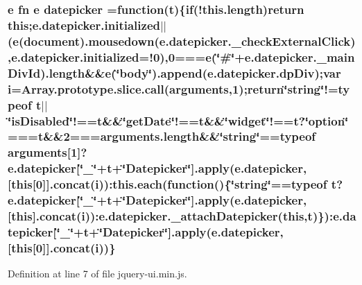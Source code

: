 {{\subsubsection[{\texorpdfstring{datepicker}{datepicker}}]{ {\bf e} {\bf fn} {\bf e} datepicker =function({\bf t})\{{\bf if}(!this.\+length)return {\bf this};{\bf e.\+datepicker.\+initialized}$\vert$$\vert$({\bf e}(document).mousedown(e.\+datepicker.\+\_\+check\+External\+Click),{\bf e.\+datepicker.\+initialized}=!0),0==={\bf e}(\char`\"{}\#\char`\"{}+e.\+datepicker.\+\_\+main\+Div\+Id).length\&\&{\bf e}(\char`\"{}body\char`\"{}).append(e.\+datepicker.\+dp\+Div);var {\bf i}={\bf Array.\+prototype.\+slice.\+call}(arguments,1);return\char`\"{}string\char`\"{}!=typeof {\bf t}$\vert$$\vert$\char`\"{}is\+Disabled\char`\"{}!==t\&\&\char`\"{}get\+Date\char`\"{}!==t\&\&\char`\"{}widget\char`\"{}!==t?\char`\"{}option\char`\"{}===t\&\&2===arguments.\+length\&\&\char`\"{}string\char`\"{}==typeof arguments\mbox{[}1\mbox{]}?e.\+datepicker\mbox{[}\char`\"{}\+\_\+\char`\"{}+t+\char`\"{}Datepicker\char`\"{}\mbox{]}.apply(e.\+datepicker,\mbox{[}{\bf this}\mbox{[}0\mbox{]}\mbox{]}.concat({\bf i}))\+:{\bf this.\+each}(function()\{\char`\"{}string\char`\"{}==typeof {\bf t}?e.\+datepicker\mbox{[}\char`\"{}\+\_\+\char`\"{}+t+\char`\"{}Datepicker\char`\"{}\mbox{]}.apply(e.\+datepicker,\mbox{[}{\bf this}\mbox{]}.concat({\bf i}))\+:e.\+datepicker.\+\_\+attach\+Datepicker({\bf this},{\bf t})\})\+:e.\+datepicker\mbox{[}\char`\"{}\+\_\+\char`\"{}+t+\char`\"{}Datepicker\char`\"{}\mbox{]}.apply(e.\+datepicker,\mbox{[}{\bf this}\mbox{[}0\mbox{]}\mbox{]}.concat({\bf i}))\}}\hypertarget{jquery-ui_8min_8js_a7c9a8108056447655bbd92e41f0c9f6f}{}\label{jquery-ui_8min_8js_a7c9a8108056447655bbd92e41f0c9f6f}


Definition at line 7 of file jquery-\/ui.\+min.\+js.

}}
